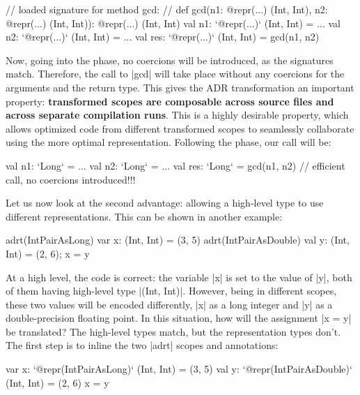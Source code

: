 \begin{lstlisting-nobreak}
// loaded signature for method gcd:
//  def gcd(n1: @repr(...) (Int, Int), n2: @repr(...) (Int, Int)): @repr(...) (Int, Int)
val n1: `@repr(...)` (Int, Int) = ...
val n2: `@repr(...)` (Int, Int) = ...
val res: `@repr(...)` (Int, Int) = gcd(n1, n2)
\end{lstlisting-nobreak}

Now, going into the \coerce{} phase, no coercions will be introduced, as the signatures match. Therefore, the call to |gcd| will take place without any coercions for the arguments and the return type. This gives the ADR transformation an important property: \textbf{transformed scopes are composable across source files and across separate compilation runs}. This is a highly desirable property, which allows optimized code from different transformed scopes to seamlessly collaborate using the more optimal representation. Following the \commit{} phase, our call will be:

\begin{lstlisting-nobreak}
val n1: `Long` = ...
val n2: `Long` = ...
val res: `Long` = gcd(n1, n2) // efficient call, no coercions introduced!!!
\end{lstlisting-nobreak}

Let us now look at the second advantage: allowing a high-level type to use different representations. This can be shown in another example:

\begin{lstlisting-nobreak}
adrt(IntPairAsLong)   { var x: (Int, Int) = (3, 5) }
adrt(IntPairAsDouble) { val y: (Int, Int) = (2, 6); x = y }
\end{lstlisting-nobreak}

At a high level, the code is correct: the variable |x| is set to the value of |y|, both of them having high-level type |(Int, Int)|. However, being in different scopes, these two values will be encoded differently, |x| as a long integer and |y| as a double-precision floating point. In this situation, how will the assignment |x = y| be translated? The high-level types match, but the representation types don't. The first step is to inline the two |adrt| scopes and \inject{} annotations:

\begin{lstlisting-nobreak}
var x: `@repr(IntPairAsLong)` (Int, Int) = (3, 5)
val y: `@repr(IntPairAsDouble)` (Int, Int) = (2, 6)
x = y
\end{lstlisting-nobreak}

